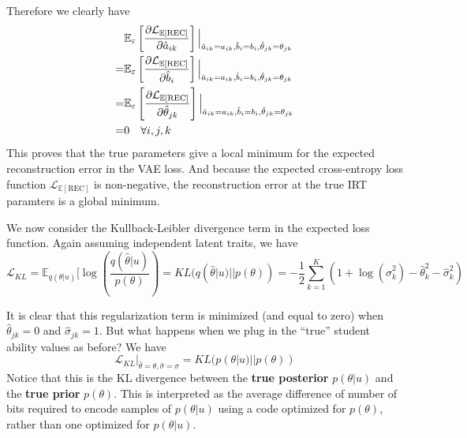 Therefore we clearly have 
\begin{equation}
  \begin{split}
  &\mathbb{E}_\varepsilon \left[\frac{\partial \mathcal{L}_{\mathbb{E}[\text{REC}]}}{\partial \hat a_{ik}}\right] \Big|_{\hat a_{ik} = a_{ik}, \hat b_i = b_i, \hat \theta_{jk} = \theta_{jk}} \\
  = &\mathbb{E}_\varepsilon \left[\frac{\partial \mathcal{L}_{\mathbb{E}[\text{REC}]}}{\partial \hat b_i}\right] \Big|_{\hat a_{ik} = a_{ik}, \hat b_i = b_i, \hat \theta_{jk} = \theta_{jk}} \\
  = &\mathbb{E}_\varepsilon \left[\frac{\partial \mathcal{L}_{\mathbb{E}[\text{REC}]}}{\partial \hat \theta_{jk}}\right] \Big|_{\hat a_{ik} = a_{ik}, \hat b_i = b_i, \hat \theta_{jk} = \theta_{jk}} \\
  = &0 \quad \forall i,j,k
\end{split}
  \label{solve}
\end{equation}
This proves that the true parameters give a local minimum for the expected reconstruction error in the VAE loss. And because the expected cross-entropy loss function $\mathcal{L}_{\mathbb{E}[\text{REC}]}$ is non-negative, the reconstruction error at the true IRT paramters is a global minimum. 

We now consider the Kullback-Leibler divergence term in the expected loss function. Again assuming independent latent traits, we have
\begin{equation}
  \mathcal{L}_{KL} = \mathbb{E}_{q(\theta | u)}[\log \left( \frac{q(\hat \theta | u)}{p(\theta)} \right) = KL(q(\hat \theta |u) || p(\theta)) = -\frac{1}{2} \sum_{k=1}^K (1 + \log(\hat \sigma_k^2) - \hat \theta_k^2 - \hat \sigma_k^2)
  \label{eq:kl}
\end{equation}

It is clear that this regularization term is minimized (and equal to zero) when $\hat \theta_{jk} = 0$ and $\hat \sigma_{jk} = 1$. But what happens when we plug in the ``true'' student ability values as before? We have
\begin{equation}
  \mathcal{L}_{KL} \Big|_{\hat \theta = \theta, \hat \sigma = \sigma} = KL(p(\theta | u) || p(\theta))
  \label{eq}
\end{equation}
Notice that this is the KL divergence between the \textbf{true posterior} $p(\theta |u)$ and the \textbf{true prior} $p(\theta)$. This is interpreted as the average difference of number of bits required to encode samples of $p(\theta |u)$ using a code optimized for $p(\theta)$, rather than one optimized for $p(\theta | u)$. 



